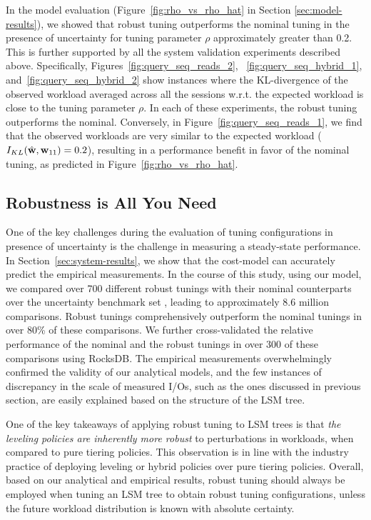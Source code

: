 In the model evaluation (Figure~\ref{fig:rho_vs_rho_hat} in Section
    \ref{sec:model-results}), we showed that robust tuning outperforms the
    nominal tuning in the presence of uncertainty for tuning parameter $\rho$
    approximately greater than 0.2.
This is further supported by all the system validation experiments described
    above.
Specifically, Figures~\ref{fig:query_seq_reads_2}, ~\ref{fig:query_seq_hybrid_1},
    and~\ref{fig:query_seq_hybrid_2} show instances where the KL-divergence
    of the observed workload averaged across all the sessions w.r.t. the expected
    workload is close to the tuning parameter $\rho$.
In each of these experiments, the robust tuning outperforms the nominal.
Conversely, in Figure~\ref{fig:query_seq_reads_1}, we find that the observed
    workloads are very similar to the expected workload ($I_{KL}({{\hat{\bf{w}}}},
    {{\bf{w}}}_{11}) = 0.2$), resulting in a performance benefit in favor of the
    nominal tuning, as predicted in Figure~\ref{fig:rho_vs_rho_hat}.

\subsection{Robustness is All You Need}

One of the key challenges during the evaluation of tuning configurations in 
    presence of uncertainty is the challenge in measuring a steady-state
    performance.
In Section~\ref{sec:system-results}, we show that the cost-model can accurately
    predict the empirical measurements.
In the course of this study, using our model, we compared over 700 different
    robust tunings with their nominal counterparts over the uncertainty
    benchmark set {\benchmark}, leading to approximately 8.6 million
    comparisons.
Robust tunings comprehensively outperform the nominal tunings in over 80\% of
    these comparisons.
We further cross-validated the relative performance of the nominal and the 
    robust tunings in over 300 of these comparisons using RocksDB.
The empirical measurements overwhelmingly confirmed the validity of our 
    analytical models, and the few instances of discrepancy in the scale of 
    measured I/Os, such as the ones discussed in previous section, are 
    easily explained based on the structure of the LSM tree.
    
One of the key takeaways of applying robust tuning to LSM trees is that
    \emph{the leveling policies are inherently more robust} to perturbations in
    workloads, when compared to pure tiering policies.
This observation is in line with the industry practice of deploying leveling or
    hybrid policies over pure tiering policies.
Overall, based on our analytical and empirical results, robust tuning should
    always be employed when tuning an LSM tree to obtain robust tuning
    configurations, unless the future workload distribution is known with
    absolute certainty.

